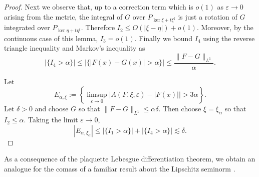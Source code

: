 \documentclass[reqno,11pt]{amsart}
\theoremstyle{definition}
\numberwithin{equation}{section}
\begin{document}
\begin{proof}
Next we observe that, up to a correction term which is $o(1)$ as $\varepsilon \to 0$ arising from the metric, the integral of $G$ over $P_{\ker \xi + t\xi^\sharp}$ is just a rotation of $G$ integrated over $P_{\ker \eta + t\eta^\sharp}$.
Therefore $I_2 \leq O(|\xi - \eta|) + o(1)$.
Moreover, by the continuous case of this lemma, $I_3 = o(1)$.
Finally we bound $I_4$ using the reverse triangle inequality and Markov's inequality as 
$$|\{I_4 > \alpha\}| \leq |\{|F(x) - G(x)| > \alpha\}| \leq \frac{\|F - G\|_{L^1}}{\alpha}.$$

Let
$$E_{\alpha, \xi} := \left\{\limsup_{\varepsilon \to 0} |A(F, \xi, \varepsilon) - |F(x)|| > 3\alpha\right\}.$$
Let $\delta > 0$ and choose $G$ so that $\|F - G\|_{L^1} \leq \alpha \delta$.
Then choose $\xi = \xi_\alpha$ so that $I_2 \leq \alpha$.
Taking the limit $\varepsilon \to 0$,
$$|E_{\alpha, \xi_\alpha}| \leq |\{I_1 > \alpha\}| + |\{I_4 > \alpha\}| \lesssim \delta.$$

\end{proof}

As a consequence of the plaquette Lebesgue differentiation theorem, we obtain an analogue for the comass of a familiar result about the Lipschitz seminorm \cite[Lemma 4.2]{Crandall2008}.
\end{document}
